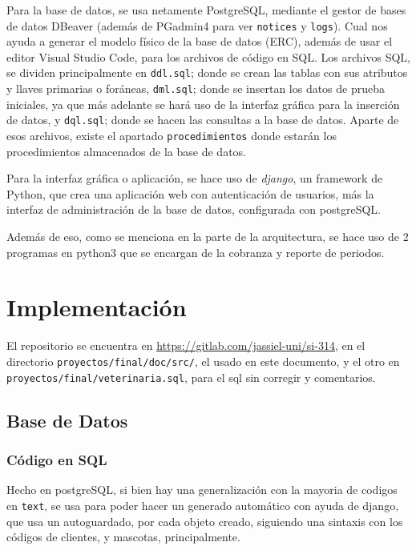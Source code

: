 \documentclass[
  12pt,
  hidelinks,
  a4paper,
  headings=standardclasses,
  headings=big,
  spanish
]{scrartcl}
\begin{document}
Para la base de datos, se usa netamente PostgreSQL, mediante el gestor de bases de datos DBeaver (además de PGadmin4 para ver \texttt{notices} y \texttt{logs}).
Cual nos ayuda a generar el modelo físico de la base de datos (ERC), además de usar el editor Visual Studio Code, para los archivos de código en SQL\@.
Los archivos SQL, se dividen principalmente en \texttt{ddl.sql}; donde se crean las tablas con sus atributos y llaves primarias o foráneas, \texttt{dml.sql}; donde se insertan los datos de prueba iniciales, ya que más adelante se hará uso de la interfaz gráfica para la inserción de datos, y \texttt{dql.sql}; donde se hacen las consultas a la base de datos.
Aparte de esos archivos, existe el apartado \texttt{procedimientos} donde estarán los procedimientos almacenados de la base de datos.

Para la interfaz gráfica o aplicación, se hace uso de \emph{django}, un framework de Python, que crea una aplicación web con autenticación de usuarios, más la interfaz de administración de la base de datos, configurada con postgreSQL\@.

Además de eso, como se menciona en la parte de la arquitectura, se hace uso de 2 programas en python3 que se encargan de la cobranza y reporte de periodos.

\pagebreak
\section{Implementación}

El repositorio se encuentra en \url{https://gitlab.com/jassiel-uni/si-314}, en el directorio \texttt{proyectos/final/doc/src/}, el usado en este documento, y el otro en \texttt{proyectos/final/veterinaria.sql}, para el sql sin corregir y comentarios.

\subsection{Base de Datos}
\subsubsection{Código en SQL}

Hecho en postgreSQL, si bien hay una generalización con la mayoria de codigos en \texttt{text}, se usa para poder hacer un generado automático con ayuda de django, que usa un autoguardado, por cada objeto creado, siguiendo una sintaxis con los códigos de clientes, y mascotas, principalmente.
\end{document}
